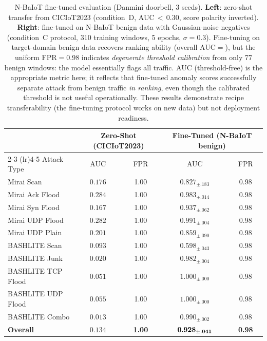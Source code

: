 
\begin{table}[h]
\centering
\caption{
  N-BaIoT fine-tuned evaluation (Danmini doorbell, 3 seeds).
  \textbf{Left}: zero-shot transfer from CICIoT2023 (condition~D,
  AUC\,$<$\,0.30, score polarity inverted).
  \textbf{Right}: fine-tuned on N-BaIoT benign data with Gaussian-noise
  negatives (condition~C protocol, 310 training windows, 5 epochs,
  $\sigma{=}0.3$).
  Fine-tuning on target-domain benign data recovers ranking ability
  (overall AUC$=$\nbaiotAUC{}), but the uniform FPR$=$0.98 indicates
  \emph{degenerate threshold calibration} from only 77 benign windows:
  the model essentially flags all traffic.
  AUC (threshold-free) is the appropriate metric here; it reflects
  that fine-tuned anomaly scores successfully separate attack from
  benign traffic \emph{in ranking}, even though the calibrated threshold
  is not useful operationally.
  These results demonstrate recipe transferability (the fine-tuning
  protocol works on new data) but not deployment readiness.
}
\label{tab:nbaiot_finetuned}
\begin{tabular}{lcc|cc}
\toprule
& \multicolumn{2}{c}{Zero-Shot (CICIoT2023)} & \multicolumn{2}{c}{Fine-Tuned (N-BaIoT benign)} \\
\cmidrule(lr){2-3} \cmidrule(lr){4-5}
Attack Type & AUC & FPR & AUC & FPR \\
\midrule
Mirai Scan         & $0.176$ & 1.00 & $0.827_{\pm.183}$ & 0.98 \\
Mirai Ack Flood    & $0.284$ & 1.00 & $0.983_{\pm.014}$ & 0.98 \\
Mirai Syn Flood    & $0.167$ & 1.00 & $0.937_{\pm.062}$ & 0.98 \\
Mirai UDP Flood    & $0.282$ & 1.00 & $0.991_{\pm.004}$ & 0.98 \\
Mirai UDP Plain    & $0.201$ & 1.00 & $0.859_{\pm.090}$ & 0.98 \\
BASHLITE Scan      & $0.093$ & 1.00 & $0.598_{\pm.043}$ & 0.98 \\
BASHLITE Junk      & $0.020$ & 1.00 & $0.982_{\pm.004}$ & 0.98 \\
BASHLITE TCP Flood & $0.051$ & 1.00 & $1.000_{\pm.000}$ & 0.98 \\
BASHLITE UDP Flood & $0.055$ & 1.00 & $1.000_{\pm.000}$ & 0.98 \\
BASHLITE Combo     & $0.013$ & 1.00 & $0.990_{\pm.002}$ & 0.98 \\
\midrule
\textbf{Overall}   & $\mathbf{0.134}$ & \textbf{1.00} & $\mathbf{0.928{}_{\pm.041}}$ & \textbf{0.98} \\
\bottomrule
\end{tabular}
\end{table}
